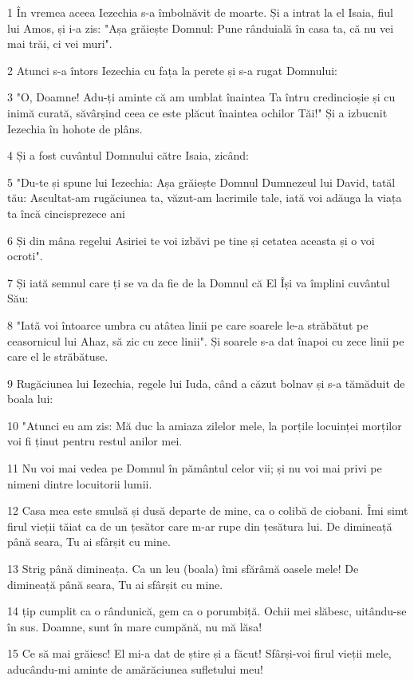 \par 1 În vremea aceea Iezechia s-a îmbolnăvit de moarte. Și a intrat la el Isaia, fiul lui Amos, și i-a zis: "Așa grăiește Domnul: Pune rânduială în casa ta, că nu vei mai trăi, ci vei muri".
\par 2 Atunci s-a întors Iezechia cu fața la perete și s-a rugat Domnului:
\par 3 "O, Doamne! Adu-ți aminte că am umblat înaintea Ta întru credincioșie și cu inimă curată, săvârșind ceea ce este plăcut înaintea ochilor Tăi!" Și a izbucnit Iezechia în hohote de plâns.
\par 4 Și a fost cuvântul Domnului către Isaia, zicând:
\par 5 "Du-te și spune lui Iezechia: Așa grăiește Domnul Dumnezeul lui David, tatăl tău: Ascultat-am rugăciunea ta, văzut-am lacrimile tale, iată voi adăuga la viața ta încă cincisprezece ani
\par 6 Și din mâna regelui Asiriei te voi izbăvi pe tine și cetatea aceasta și o voi ocroti".
\par 7 Și iată semnul care ți se va da fie de la Domnul că El Își va împlini cuvântul Său:
\par 8 "Iată voi întoarce umbra cu atâtea linii pe care soarele le-a străbătut pe ceasornicul lui Ahaz, să zic cu zece linii". Și soarele s-a dat înapoi cu zece linii pe care el le străbătuse.
\par 9 Rugăciunea lui Iezechia, regele lui Iuda, când a căzut bolnav și s-a tămăduit de boala lui:
\par 10 "Atunci eu am zis: Mă duc la amiaza zilelor mele, la porțile locuinței morților voi fi ținut pentru restul anilor mei.
\par 11 Nu voi mai vedea pe Domnul în pământul celor vii; și nu voi mai privi pe nimeni dintre locuitorii lumii.
\par 12 Casa mea este smulsă și dusă departe de mine, ca o colibă de ciobani. Îmi simt firul vieții tăiat ca de un țesător care m-ar rupe din țesătura lui. De dimineață până seara, Tu ai sfârșit cu mine.
\par 13 Strig până dimineața. Ca un leu (boala) îmi sfărâmă oasele mele! De dimineață până seara, Tu ai sfârșit cu mine.
\par 14 țip cumplit ca o rândunică, gem ca o porumbiță. Ochii mei slăbesc, uitându-se în sus. Doamne, sunt în mare cumpănă, nu mă lăsa!
\par 15 Ce să mai grăiesc! El mi-a dat de știre și a făcut! Sfârși-voi firul vieții mele, aducându-mi aminte de amărăciunea sufletului meu!
